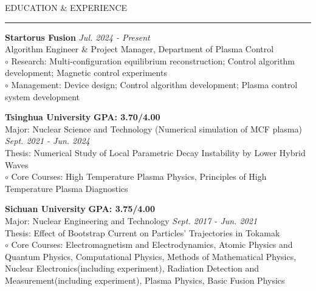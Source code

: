 \documentclass{resume} %
\renewenvironment{rSection}[1]{
\sectionskip
\textcolor{TsinghuaPurple}{\MakeUppercase{#1}}
\sectionlineskip
\hrule
\begin{list}{}{
\setlength{\leftmargin}{0em}
}
\item[]
}{
\end{list}
}
\begin{document}
  


\begin{rSection}{Education \& Experience}

{\bf Startorus Fusion} \hfill \textit{Jul. 2024 - Present}
\\
Algorithm Engineer \& Project Manager, Department of Plasma Control
\\ $\circ$ Research: Multi-configuration equilibrium reconstruction; Control algorithm development; Magnetic control experiments
\\ $\circ$ Management: Device design; Control algorithm development; Plasma control system development

{\bf Tsinghua University} \hfill {\bf GPA: 3.70/4.00}
\\ 
{Major: Nuclear Science and Technology} (Numerical simulation of MCF plasma)  \hfill \textit{Sept. 2021 - Jun. 2024}
\\
Thesis: Numerical Study of Local Parametric Decay Instability by Lower Hybrid Waves  
\\ $\circ$ Core Courses: High Temperature Plasma Physics, Principles of High Temperature Plasma Diagnostics

{\bf Sichuan University} \hfill  {\bf GPA: 3.75/4.00}
\\ 
{Major: Nuclear Engineering and Technology} \hfill \textit{Sept. 2017 - Jun. 2021}
\\
Thesis: Effect of Bootstrap Current on Particles’ Trajectories in Tokamak
\\ $\circ$ Core Courses: Electromagnetism and Electrodynamics, Atomic Physics and Quantum Physics, Computational Physics, Methods of Mathematical Physics, Nuclear Electronics(including experiment), Radiation Detection and Measurement(including experiment), Plasma Physics, Basic Fusion Physics


\end{rSection} 

\end{document}

